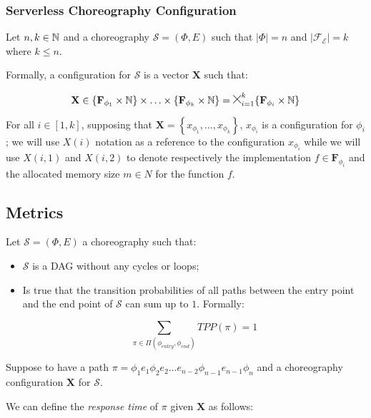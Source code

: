 \subsubsection{Serverless Choreography Configuration}

Let $n,k \in \mathbb{N}$ and a choreography $\mathcal{S} = (\Phi,E)$ such that $|\Phi| = n$ and $|\mathscr{F_E}| = k$ where $k \leq n$.

Formally, a configuration for $\mathcal{S}$ is a vector $\textbf{X}$ such that:

\begin{equation}
\textbf{X} \in \lbrace \textbf{F}_{\phi_{1}} \times \mathbb{N} \rbrace \times \ldots \times \lbrace \textbf{F}_{\phi_{k}} \times \mathbb{N} \rbrace = \Cross_{i = 1}^k \lbrace \textbf{F}_{\phi_{i}} \times \mathbb{N} \rbrace
\end{equation}

For all $i \in \left[ 1, k \right]$, supposing that $\textbf{X} = \left\lbrace x_{\phi_{1}}, \ldots, x_{\phi_{k}} \right\rbrace $, $x_{\phi_{i}}$ is a configuration for $\phi_{i}$; we will use $X(i)$ notation as a reference to the configuration $x_{\phi_{i}}$ while we will use $X(i,1)$ and $X(i,2)$ to denote respectively the implementation $f \in \textbf{F}_{\phi_i}$ and the allocated memory size $m \in N$ for the function $f$.

\subsection{Metrics}

Let $\mathcal{S} = (\Phi,E)$ a choreography such that:
\begin{itemize}
	\item $\mathcal{S}$ is a DAG without any cycles or loops;
	\item Is true that the transition probabilities of all paths between the entry point and
	the end point of $\mathcal{S}$ can sum up to $1$. Formally:
	
	\begin{equation}
		\sum_{\pi \in \Pi(\phi_{entry}, \phi_{end})} TPP(\pi) = 1
	\end{equation}

\end{itemize}

Suppose to have a path $\pi = \phi_1 e_1 \phi_2 e_2 \ldots e_{n-2}\phi_{n-1} e_{n-1} \phi_n$ and a choreography configuration $\textbf{X}$ for $\mathcal{S}$. 

We can define the \textit{response time} of $\pi$ given $\textbf{X}$ as follows:

